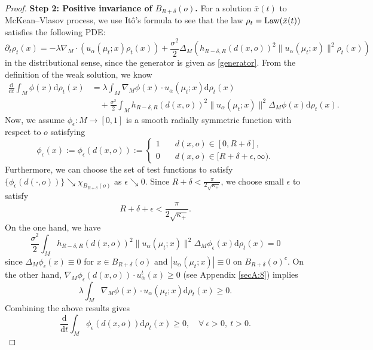 \documentclass[11pt]{amsart}
\newcommand{\kp}{\kappa}
\def\d{\mathrm{d}}
\newcommand{\p}{o}%
\newcommand{\dist}{d}%
\begin{document}
\begin{proof}
\noindent\textbf{Step 2: Positive invariance of $B_{R+\delta}(o)$.} For a solution $\bar x(t)$ to McKean--Vlasov process, we use Itô's formula to see that  the law $\rho_t = \textup{Law}(\bar x(t))$ satisfies  the following PDE:
\[
\partial_t\rho_t(x)=-\lambda\nabla_M\cdot(u_\alpha(\mu_t;x)\rho_t(x))+\frac{\sigma^2}{2}\Delta_M\left(h_{R-\delta, R}(\dist(x, \p))^2\|u_\alpha(\mu_t;x)\|^2\rho_t(x)\right)
\]
in the distributional sense, since the generator is given as \eqref{generator}. From the definition of the weak solution, we know
\begin{align*} 
\frac{\d}{\d t}\int_M \phi(x)\d\rho_t(x)&=\lambda\int_M \nabla_M \phi(x)\cdot u_\alpha(\mu_t;x)\d \rho_t(x) \\
&\quad +\frac{\sigma^2}{2}\int_Mh_{R-\delta, R}(\dist(x, \p))^2\|u_\alpha(\mu_t;x)\|^2\Delta_M\phi(x)\d\rho_t(x).
\end{align*} 
Now, we assume $\phi_\epsilon:M\to[0, 1]$ is a smooth radially symmetric function with respect to $\p$ satisfying
\[
\phi_\epsilon(x):= \phi_\epsilon(\dist(x, \p)):=\begin{cases}
1&\quad \dist(x, \p)\in[0, R+\delta],\\
0&\quad \dist(x, \p)\in[R+\delta+\epsilon, \infty).
\end{cases}
\]
Furthermore, we can choose the set of test functions to satisfy $\{\phi_\epsilon(\dist(\cdot, \p))\}\searrow\chi_{B_{R+\delta}(\p)}$ as $\epsilon\searrow0$.  Since $R+\delta<\frac{\pi}{2\sqrt{\kp_+}}$, we choose small $\epsilon$ to satisfy 
\[
R+\delta+\epsilon<\frac{\pi}{2\sqrt{\kappa_+}}.
\]
On the one hand, we have
\[
\frac{\sigma^2}{2}\int_Mh_{R-\delta, R}(\dist(x, \p))^2\|u_\alpha(\mu_t;x)\|^2\Delta_M\phi_\epsilon(x)\d\rho_t(x)=0
\]
since $\Delta_M\phi_\epsilon(x)\equiv0$ for $x\in B_{R+\delta}(\p)$ and $|u_\alpha(\mu_t;x)|\equiv0$ on $B_{R+\delta}(\p)^c$. On the other hand, $\nabla_M\phi_\epsilon(\dist(x, \p))\cdot u_\alpha^t(x)\geq0$ (see Appendix \ref{secA:8}) implies
\[
\lambda\int_M \nabla_M \phi(x)\cdot u_\alpha(\mu_t;x)\d \rho_t(x)\geq0.
\]
Combining the above results gives
\[
\frac{\d}{\d t}\int_M \phi_\epsilon(\dist(x, \p))\d\rho_t(x)\geq0,\quad\forall~\epsilon>0,~t>0.
\]




\end{proof}
\end{document}
